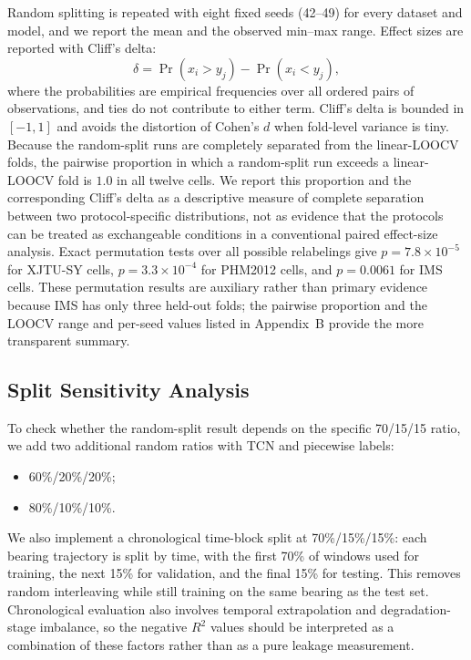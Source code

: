 \documentclass[pdflatex,sn-mathphys-num]{sn-jnl}
\begin{document}
Random splitting is repeated with eight fixed seeds (42--49) for every dataset and model, and we report the mean and the observed min--max range. Effect sizes are reported with Cliff's delta:
\begin{equation}
\delta = \Pr(x_i > y_j) - \Pr(x_i < y_j),
\label{eq:cliff}
\end{equation}
where the probabilities are empirical frequencies over all ordered pairs of observations, and ties do not contribute to either term. Cliff's delta is bounded in $[-1, 1]$ and avoids the distortion of Cohen's $d$ when fold-level variance is tiny. Because the random-split runs are completely separated from the linear-LOOCV folds, the pairwise proportion in which a random-split run exceeds a linear-LOOCV fold is $1.0$ in all twelve cells. We report this proportion and the corresponding Cliff's delta as a descriptive measure of complete separation between two protocol-specific distributions, not as evidence that the protocols can be treated as exchangeable conditions in a conventional paired effect-size analysis. Exact permutation tests over all possible relabelings give $p=7.8\times10^{-5}$ for XJTU-SY cells, $p=3.3\times10^{-4}$ for PHM2012 cells, and $p=0.0061$ for IMS cells. These permutation results are auxiliary rather than primary evidence because IMS has only three held-out folds; the pairwise proportion and the LOOCV range and per-seed values listed in Appendix~B provide the more transparent summary.

\subsection{Split Sensitivity Analysis}
To check whether the random-split result depends on the specific 70/15/15 ratio, we add two additional random ratios with TCN and piecewise labels:
\begin{itemize}
    \item 60\%/20\%/20\%;
    \item 80\%/10\%/10\%.
\end{itemize}
We also implement a chronological time-block split at 70\%/15\%/15\%: each bearing trajectory is split by time, with the first 70\% of windows used for training, the next 15\% for validation, and the final 15\% for testing. This removes random interleaving while still training on the same bearing as the test set. Chronological evaluation also involves temporal extrapolation and degradation-stage imbalance, so the negative $R^2$ values should be interpreted as a combination of these factors rather than as a pure leakage measurement.
\end{document}
